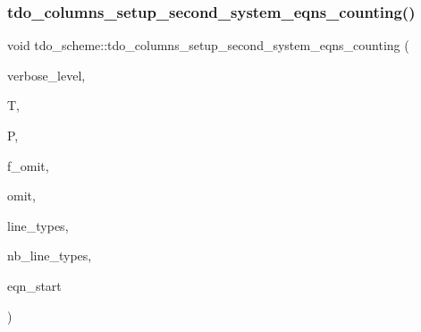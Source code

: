 \subsubsection{\texorpdfstring{tdo\+\_\+columns\+\_\+setup\+\_\+second\+\_\+system\+\_\+eqns\+\_\+counting()}{tdo\_columns\_setup\_second\_system\_eqns\_counting()}}
{\footnotesize\ttfamily void tdo\+\_\+scheme\+::tdo\+\_\+columns\+\_\+setup\+\_\+second\+\_\+system\+\_\+eqns\+\_\+counting (\begin{DoxyParamCaption}\item[{\mbox{\hyperlink{galois_8h_a09fddde158a3a20bd2dcadb609de11dc}{I\+NT}}}]{verbose\+\_\+level,  }\item[{\mbox{\hyperlink{classtdo__data}{tdo\+\_\+data}} \&}]{T,  }\item[{\mbox{\hyperlink{classpartitionstack}{partitionstack}} \&}]{P,  }\item[{\mbox{\hyperlink{galois_8h_a09fddde158a3a20bd2dcadb609de11dc}{I\+NT}}}]{f\+\_\+omit,  }\item[{\mbox{\hyperlink{galois_8h_a09fddde158a3a20bd2dcadb609de11dc}{I\+NT}}}]{omit,  }\item[{\mbox{\hyperlink{galois_8h_a09fddde158a3a20bd2dcadb609de11dc}{I\+NT}} $\ast$}]{line\+\_\+types,  }\item[{\mbox{\hyperlink{galois_8h_a09fddde158a3a20bd2dcadb609de11dc}{I\+NT}}}]{nb\+\_\+line\+\_\+types,  }\item[{\mbox{\hyperlink{galois_8h_a09fddde158a3a20bd2dcadb609de11dc}{I\+NT}}}]{eqn\+\_\+start }\end{DoxyParamCaption})}

\mbox{\label{classtdo__scheme_a00a84291c06fdcfd814afa2dbfb1fda0}} 
